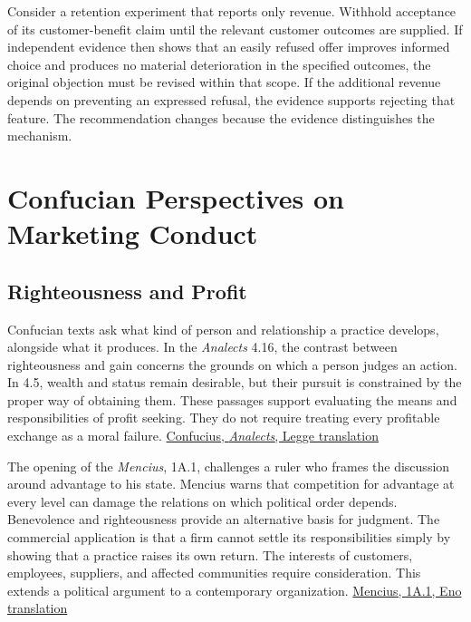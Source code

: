 Consider a retention experiment that reports only revenue. Withhold
acceptance of its customer-benefit claim until the relevant customer
outcomes are supplied. If independent evidence then shows that an easily
refused offer improves informed choice and produces no material
deterioration in the specified outcomes, the original objection must be
revised within that scope. If the additional revenue depends on
preventing an expressed refusal, the evidence supports rejecting that
feature. The recommendation changes because the evidence distinguishes
the mechanism.


\hypertarget{M09-confucian-perspectives-on-marketing-conduct}{%
\section{Confucian Perspectives on Marketing
Conduct}\label{M09-confucian-perspectives-on-marketing-conduct}}

\noindent \hypertarget{M09-righteousness-and-profit}{%
\subsection{Righteousness and
Profit}\label{M09-righteousness-and-profit}}

\noindent \noindent Confucian texts ask what kind of person and relationship a
practice develops, alongside what it produces. In the \emph{Analects}
4.16, the contrast between righteousness and gain concerns the grounds
on which a person judges an action. In 4.5, wealth and status remain
desirable, but their pursuit is constrained by the proper way of
obtaining them. These passages support evaluating the means and
responsibilities of profit seeking. They do not require treating every
profitable exchange as a moral failure.
\href{https://www.gutenberg.org/cache/epub/3330/pg3330-images.html}{Confucius,
\emph{Analects}, Legge translation}

The opening of the \emph{Mencius}, 1A.1, challenges a ruler who frames
the discussion around advantage to his state. Mencius warns that
competition for advantage at every level can damage the relations on
which political order depends. Benevolence and righteousness provide an
alternative basis for judgment. The commercial application is that a
firm cannot settle its responsibilities simply by showing that a
practice raises its own return. The interests of customers, employees,
suppliers, and affected communities require consideration. This extends
a political argument to a contemporary organization.
\href{https://scholarworks.iu.edu/iuswrrest/api/core/bitstreams/265d73a0-6bfa-45df-92ff-4e7d3f8be4b1/content}{Mencius,
1A.1, Eno translation}

